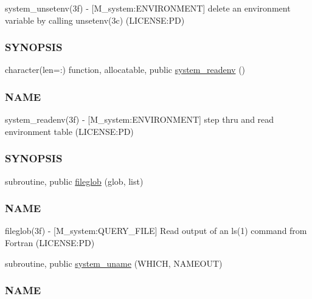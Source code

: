 \begin{DoxyCompactItemize}
\begin{DoxyCompactList}
system\+\_\+unsetenv(3f) -\/ \mbox{[}M\+\_\+system\+:E\+N\+V\+I\+R\+O\+N\+M\+E\+NT\mbox{]} delete an environment variable by calling unsetenv(3c) (L\+I\+C\+E\+N\+SE\+:PD) \subsubsection*{S\+Y\+N\+O\+P\+S\+IS}\end{DoxyCompactList}\item 
character(len=\+:) function, allocatable, public \mbox{\hyperlink{namespacem__system_ae0e43010a82a6a25402568ccb326322d}{system\+\_\+readenv}} ()
\begin{DoxyCompactList}\small\item\em \subsubsection*{N\+A\+ME}

system\+\_\+readenv(3f) -\/ \mbox{[}M\+\_\+system\+:E\+N\+V\+I\+R\+O\+N\+M\+E\+NT\mbox{]} step thru and read environment table (L\+I\+C\+E\+N\+SE\+:PD) \subsubsection*{S\+Y\+N\+O\+P\+S\+IS}\end{DoxyCompactList}\item 
subroutine, public \mbox{\hyperlink{namespacem__system_a79656f76ad75168302e0d770052e901e}{fileglob}} (glob, list)
\begin{DoxyCompactList}\small\item\em \subsubsection*{N\+A\+ME}

fileglob(3f) -\/ \mbox{[}M\+\_\+system\+:Q\+U\+E\+R\+Y\+\_\+\+F\+I\+LE\mbox{]} Read output of an ls(1) command from Fortran (L\+I\+C\+E\+N\+SE\+:PD) \end{DoxyCompactList}\item 
subroutine, public \mbox{\hyperlink{namespacem__system_a04e5d49509c44bcb2ccabfd80ec8cdfb}{system\+\_\+uname}} (W\+H\+I\+CH, N\+A\+M\+E\+O\+UT)
\begin{DoxyCompactList}\small\item\em \subsubsection*{N\+A\+ME}


\end{DoxyCompactList}
\end{DoxyCompactItemize}
